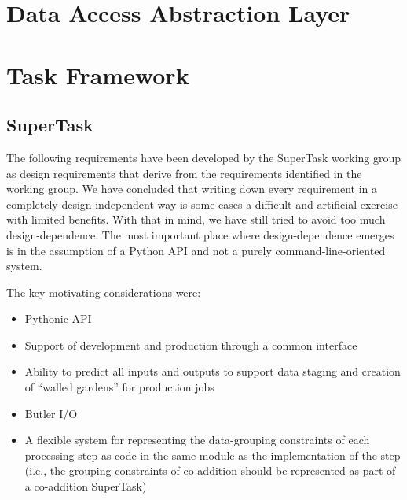 \documentclass[SE,toc,lsstdraft]{lsstdoc}
\begin{document}
\maketitle


\section{Data Access Abstraction Layer}





\section{Task Framework}





\subsection{SuperTask}

The following requirements have been developed by the SuperTask working group as design requirements that derive from the requirements identified in the working group. We have concluded that writing down every requirement in a completely design-independent way is some cases a difficult and artificial exercise with limited benefits. With that in mind, we have still tried to avoid too much design-dependence. The most important place where design-dependence emerges is in the assumption of a Python API and not a purely command-line-oriented system.









The key motivating considerations were:



    \begin{itemize}
\item
Pythonic API

\item
Support of development and production through a common interface

\item
Ability to predict all inputs and outputs to support data staging and creation of “walled gardens” for production jobs

\item
Butler I/O

\item
A flexible system for representing the data-grouping constraints of each processing step as code in the same module as the implementation of the step (i.e., the grouping constraints of co-addition should be represented as part of a co-addition SuperTask)

    \end{itemize}
\end{document}
